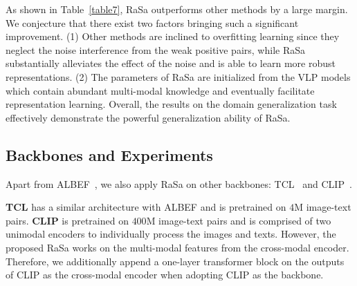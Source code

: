 \documentclass{article}
\begin{document}
As shown in Table~\ref{table7}, RaSa outperforms other methods by a large margin. 
We conjecture that there exist two factors bringing such a significant improvement.
(1) Other methods are inclined to overfitting learning since they neglect the noise interference from the weak positive pairs, while RaSa substantially alleviates the effect of the noise and is able to learn more robust representations.
(2) The parameters of RaSa are initialized from the VLP models which contain abundant multi-modal knowledge and eventually facilitate representation learning.
Overall, the results on the domain generalization task effectively demonstrate the powerful generalization ability of RaSa.



\subsection{Backbones and Experiments}
\label{backbones}
Apart from ALBEF~\cite{NEURIPS2021_50525975}, we also apply RaSa on other backbones: TCL~\cite{yang2022vision} and CLIP~\cite{radford2021learning}.

\textbf{TCL} has a similar architecture with ALBEF and is pretrained on $4$M image-text pairs.
\textbf{CLIP} is pretrained on $400$M image-text pairs and is comprised of two unimodal encoders to individually process the images and texts.
However, the proposed RaSa works on the multi-modal features from the cross-modal encoder.
Therefore, we additionally append a one-layer transformer block on the outputs of CLIP as the cross-modal encoder when adopting CLIP as the backbone. 
\end{document}
